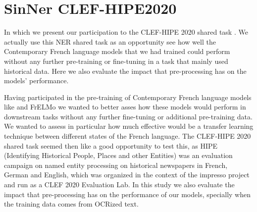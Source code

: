\chapter{SinNer CLEF-HIPE2020}

\begin{center}
    \begin{minipage}{0.66\textwidth}
        \begin{small}
            In which we present our participation \citep{ortiz-suarez-etal-2020-sinner} to the CLEF-HIPE 2020 shared task \citep{ehrmann-etal-2020-extended}. We actually use this NER shared task as an opportunity see how well the Contemporary French language models that we had trained could perform without any further pre-training or fine-tuning in a task that mainly used historical data. Here we also evaluate the impact that pre-processing has on the models' performance.\footnotemark
        \end{small}
    \end{minipage}
    \vspace{0.5cm}
\end{center}


Having participated in the pre-training of Contemporary French language models like \camembert \citep{martin-etal-2020-camembert} and FrELMo \citep{ortiz-suarez-etal-2020-establishing,popa-fabre-etal-2020-french} we wanted to better asses how these models would perform in downstream tasks without any further fine-tuning or additional pre-training data. We wanted to assess in particular how much effective would be a transfer learning technique between different states of the French language. The CLEF-HIPE 2020 shared task \citep{ehrmann-etal-2020-extended} seemed then like a good opportunity to test this, as HIPE (Identifying Historical People, Places and other Entities) was an evaluation campaign on named entity processing on historical newspapers in French, German and English, which was organized in the context of the impresso project and run as a CLEF 2020 Evaluation Lab. In this study we also evaluate the impact that pre-processing has on the performance of our models, specially when the training data comes from OCRized text.


